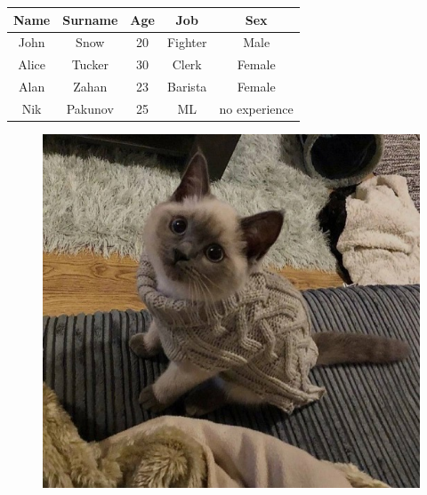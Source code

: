 \documentclass{article}
\begin{document}
\begin{table}[h!]
\centering
\begin{tabular}{|c|c|c|c|c|}
\hline
Name & Surname & Age & Job & Sex \\
\hline
John & Snow & 20 & Fighter & Male \\
\hline
Alice & Tucker & 30 & Clerk & Female \\
\hline
Alan & Zahan & 23 & Barista & Female \\
\hline
Nik & Pakunov & 25 & ML & no experience \\
\hline
\end{tabular}
\end{table}
\begin{figure}[h!]
\centering
\includegraphics{artifacts/photo_2_2.png}
\end{figure}
\end{document}
